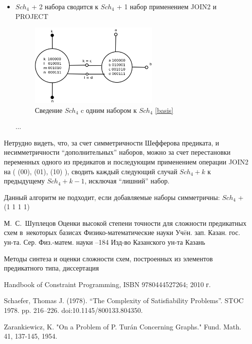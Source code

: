\documentclass[12pt]{article}
\begin{document}
\begin{itemize}
\item $Sch_4$ + 2 набора сводится к $Sch_4$ + 1 набор применением JOIN2 и PROJECT
\begin{figure}[htb]
\centering
\includegraphics[width=0.6\textwidth]{4_2to4_1.png}
\caption{Сведение $Sch_4$ c одним набором к $Sch_4$ \ref{basis}}
\label{fig:4_2to4_1}
\end{figure}

$\ldots$

\end{itemize}

Нетрудно видеть, что, за счет симметричности Шефферова предиката, и несимметричности ``дополнительных'' наборов, можно за
счет перестановки переменных одного из предикатов и последующим применением операции JOIN2 на ( (00), (01), (10) ), сводить 
каждый следующий случай $Sch_4 + k$ к предыдущему $Sch_4 + k-1$, исключая ``лишний'' набор.

Данный алгоритм не подходит, если добавляемые наборы симметричны: $Sch_4$ + (1 1 1 1)
\clearpage
{}
    \by М.~С.~Шуплецов
    \paper Оценки высокой степени точности для сложности предикатных схем в~некоторых базисах
    \inbook Физико-математические науки
    \serial Уч\"eн. зап. Казан. гос. ун-та. Сер. Физ.-матем. науки
    --184
    \publ Изд-во Казанского ун-та
    \publaddr Казань

Методы синтеза и оценки сложности схем, построенных из элементов предикатного типа, диссертация

 Handbook of Constraint Programming, ISBN 9780444527264; 2010 г.

 Schaefer, Thomas J. (1978). 
``The Complexity of Satisfiability Problems''. STOC 1978. pp. 216–226. doi:10.1145/800133.804350.

 Zarankiewicz, K. "On a Problem of P. Turán Concerning Graphs." Fund. Math. 41, 137-145, 1954. 
\end{document}
